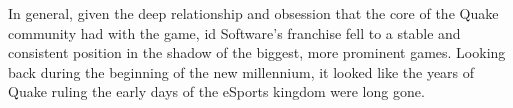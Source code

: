 In general, given the deep relationship and obsession that the core of the Quake community had with the game, id Software's franchise fell to a stable and consistent position in the shadow of the biggest, more prominent games. Looking back during the beginning of the new millennium, it looked like the years of Quake ruling the early days of the eSports kingdom were long gone.














































